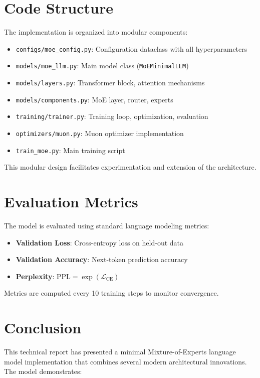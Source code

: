 \documentclass[11pt,a4paper]{article}
\begin{document}
\section{Code Structure}

The implementation is organized into modular components:

\begin{itemize}
    \item \texttt{configs/moe\_config.py}: Configuration dataclass with all hyperparameters
    \item \texttt{models/moe\_llm.py}: Main model class (\texttt{MoEMinimalLLM})
    \item \texttt{models/layers.py}: Transformer block, attention mechanisms
    \item \texttt{models/components.py}: MoE layer, router, experts
    \item \texttt{training/trainer.py}: Training loop, optimization, evaluation
    \item \texttt{optimizers/muon.py}: Muon optimizer implementation
    \item \texttt{train\_moe.py}: Main training script
\end{itemize}

This modular design facilitates experimentation and extension of the architecture.

\section{Evaluation Metrics}

The model is evaluated using standard language modeling metrics:

\begin{itemize}
    \item \textbf{Validation Loss}: Cross-entropy loss on held-out data
    \item \textbf{Validation Accuracy}: Next-token prediction accuracy
    \item \textbf{Perplexity}: $\text{PPL} = \exp(\mathcal{L}_{\text{CE}})$
\end{itemize}

Metrics are computed every 10 training steps to monitor convergence.

\section{Conclusion}

This technical report has presented a minimal Mixture-of-Experts language model implementation that combines several modern architectural innovations. The model demonstrates:
\end{document}
